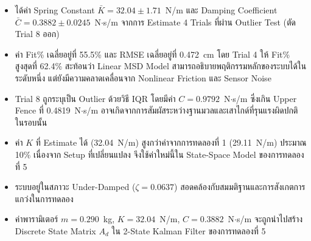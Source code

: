 \begin{itemize}
    \item ได้ค่า Spring Constant $\bar{K} = 32.04 \pm 1.71$~N/m
          และ Damping Coefficient $\bar{C} = 0.3882 \pm 0.0245$~N$\cdot$s/m
          จากการ Estimate 4 Trials ที่ผ่าน Outlier Test (ตัด Trial 8 ออก)

    \item ค่า Fit\% เฉลี่ยอยู่ที่ 55.5\% และ RMSE เฉลี่ยอยู่ที่ 0.472~cm
          โดย Trial 4 ให้ Fit\% สูงสุดที่ 62.4\% สะท้อนว่า Linear MSD Model
          สามารถอธิบายพฤติกรรมหลักของระบบได้ในระดับหนึ่ง
          แต่ยังมีความคลาดเคลื่อนจาก Nonlinear Friction และ Sensor Noise

    \item Trial 8 ถูกระบุเป็น Outlier ด้วยวิธี IQR โดยมีค่า
          $C = 0.9792$~N$\cdot$s/m ซึ่งเกิน Upper Fence ที่ 0.4819~N$\cdot$s/m
          อาจเกิดจากการสัมผัสระหว่างฐานมวลและเสาไกด์ที่รุนแรงผิดปกติ
          ในรอบนั้น

    \item ค่า $K$ ที่ Estimate ได้ (32.04~N/m) สูงกว่าค่าจากการทดลองที่ 1
          (29.11~N/m) ประมาณ 10\% เนื่องจาก Setup ที่เปลี่ยนแปลง
          จึงใช้ค่าใหม่นี้ใน State-Space Model ของการทดลองที่ 5

    \item ระบบอยู่ในสภาวะ Under-Damped ($\zeta = 0.0637$)
          สอดคล้องกับสมมติฐานและการสังเกตการแกว่งในการทดลอง

    \item ค่าพารามิเตอร์ $m = 0.290$~kg, $K = 32.04$~N/m,
          $C = 0.3882$~N$\cdot$s/m จะถูกนำไปสร้าง Discrete State Matrix $A_d$
          ใน 2-State Kalman Filter ของการทดลองที่ 5
\end{itemize}

